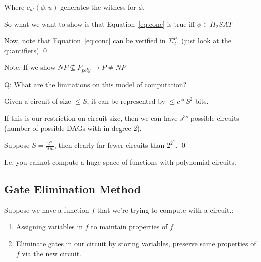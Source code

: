 \documentclass[11pt]{article} %
\begin{document}
Where $c_{n'}(\phi,u)$ generates the witness for $\phi$.

So what we want to show is that Equation~\ref{eq:conc} is true iff $\phi \in \Pi_2 SAT$

Now, note that Equation~\ref{eq:conc} can be verified in $\Sigma_2^P$. (just look at the quantifiers) \qed

Note: If we show $NP \not \subseteq P_{poly} \rightarrow P \neq NP$

\midline

Q: What are the limitations on this model of computation?


 Given a circuit of size $\leq S$, it can be represented by $\leq c* S^2$ bits.

If this is our restriction on circuit size, then we can have $s^{3s}$ possible circuits (number of possible DAGs with in-degree 2).

Suppose $S = \frac{2^n}{10n}$, then clearly far fewer circuits than $2^{2^n}$. \qed

I.e. you cannot compute a huge space of functions with polynomial circuits.

\midline


\midline

\subsection{Gate Elimination Method}


Suppose we have a function $f$ that we're trying to compute with a circuit.:
\begin{enumerate}[(1)]
\item Assigning variables in $f$ to maintain properties of $f$.
\item Eliminate gates in our circuit by storing variables, preserve same properties of $f$ via the new circuit.
\end{enumerate}
\end{document}
